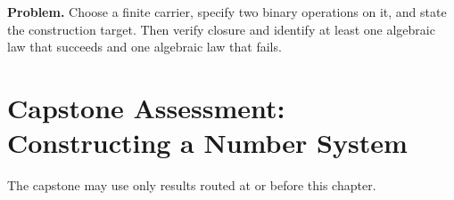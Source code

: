 \newpage
{}
\label{cap:constructing-number-systems}

\begin{tcolorbox}[
  colback=gray!6,
  colframe=gray!40,
  arc=2pt,
  left=8pt, right=8pt, top=6pt, bottom=6pt,
  title={\small\textbf{Capstone Problem}},
  fonttitle=\small\bfseries
]
\textbf{Problem.}
Choose a finite carrier, specify two binary operations on it, and state the
construction target. Then verify closure and identify at least one algebraic
law that succeeds and one algebraic law that fails.
\end{tcolorbox}

\section{Capstone Assessment: Constructing a Number System}

\begin{remark*}
The capstone may use only results routed at or before this chapter.
\end{remark*}

\clearpage
